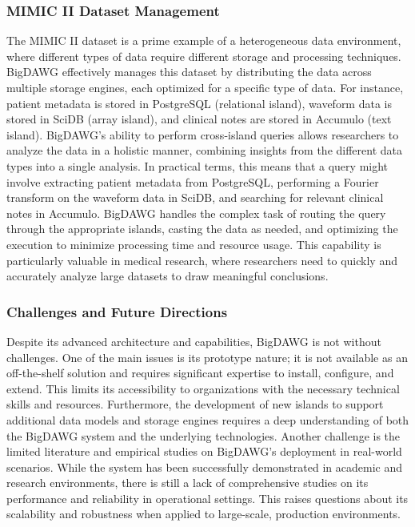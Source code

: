 \subsubsection{MIMIC II Dataset Management}
The MIMIC II dataset is a prime example of a heterogeneous data environment, where different types of data require different storage and processing techniques. \ac{BigDAWG} effectively manages this dataset by distributing the data across multiple storage engines, each optimized for a specific type of data. For instance, patient metadata is stored in PostgreSQL (relational island), waveform data is stored in SciDB (array island), and clinical notes are stored in Accumulo (text island). \ac{BigDAWG}'s ability to perform cross-island queries allows researchers to analyze the data in a holistic manner, combining insights from the different data types into a single analysis.
In practical terms, this means that a query might involve extracting patient metadata from PostgreSQL, performing a Fourier transform on the waveform data in SciDB, and searching for relevant clinical notes in Accumulo. \ac{BigDAWG} handles the complex task of routing the query through the appropriate islands, casting the data as needed, and optimizing the execution to minimize processing time and resource usage. This capability is particularly valuable in medical research, where researchers need to quickly and accurately analyze large datasets to draw meaningful conclusions.
\subsubsection{Challenges and Future Directions}
Despite its advanced architecture and capabilities, \ac{BigDAWG} is not without challenges. One of the main issues is its prototype nature; it is not available as an off-the-shelf solution and requires significant expertise to install, configure, and extend. This limits its accessibility to organizations with the necessary technical skills and resources. Furthermore, the development of new islands to support additional data models and storage engines requires a deep understanding of both the \ac{BigDAWG} system and the underlying technologies.
Another challenge is the limited literature and empirical studies on \ac{BigDAWG}'s deployment in real-world scenarios. While the system has been successfully demonstrated in academic and research environments, there is still a lack of comprehensive studies on its performance and reliability in operational settings. This raises questions about its scalability and robustness when applied to large-scale, production environments.
